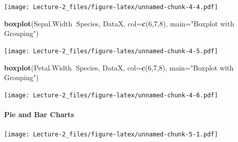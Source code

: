 \documentclass[
]{article}
\newenvironment{Shaded}{\begin{snugshade}}{\end{snugshade}}
\newcommand{\CommentTok}[1]{\textcolor[rgb]{0.56,0.35,0.01}{\textit{#1}}}
\newcommand{\DataTypeTok}[1]{\textcolor[rgb]{0.13,0.29,0.53}{#1}}
\newcommand{\DecValTok}[1]{\textcolor[rgb]{0.00,0.00,0.81}{#1}}
\newcommand{\KeywordTok}[1]{\textcolor[rgb]{0.13,0.29,0.53}{\textbf{#1}}}
\newcommand{\NormalTok}[1]{#1}
\newcommand{\OperatorTok}[1]{\textcolor[rgb]{0.81,0.36,0.00}{\textbf{#1}}}
\newcommand{\StringTok}[1]{\textcolor[rgb]{0.31,0.60,0.02}{#1}}
\begin{document}
\texttt{[image: Lecture-2\_files/figure-latex/unnamed-chunk-4-4.pdf]}

\begin{Shaded}
\begin{Highlighting}[]
\KeywordTok{boxplot}\NormalTok{(Sepal.Width}\OperatorTok{~}\NormalTok{Species, DataX, }\DataTypeTok{col=}\KeywordTok{c}\NormalTok{(}\DecValTok{6}\NormalTok{,}\DecValTok{7}\NormalTok{,}\DecValTok{8}\NormalTok{), }\DataTypeTok{main=}\StringTok{"Boxplot with Grouping"}\NormalTok{)}
\end{Highlighting}
\end{Shaded}

\texttt{[image: Lecture-2\_files/figure-latex/unnamed-chunk-4-5.pdf]}

\begin{Shaded}
\begin{Highlighting}[]
\KeywordTok{boxplot}\NormalTok{(Petal.Width}\OperatorTok{~}\NormalTok{Species, DataX, }\DataTypeTok{col=}\KeywordTok{c}\NormalTok{(}\DecValTok{6}\NormalTok{,}\DecValTok{7}\NormalTok{,}\DecValTok{8}\NormalTok{), }\DataTypeTok{main=}\StringTok{"Boxplot with Grouping"}\NormalTok{)}
\end{Highlighting}
\end{Shaded}

\texttt{[image: Lecture-2\_files/figure-latex/unnamed-chunk-4-6.pdf]}

\hypertarget{pie-and-bar-charts}{%
\paragraph{Pie and Bar Charts}\label{pie-and-bar-charts}}

\begin{Shaded}
\end{Shaded}

\texttt{[image: Lecture-2\_files/figure-latex/unnamed-chunk-5-1.pdf]}

\begin{Shaded}
\end{Shaded}
\end{document}
